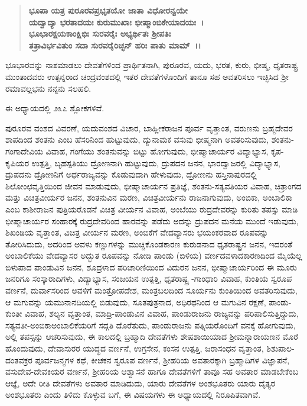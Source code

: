 \begin{verse}
\textbf{ಭೂಪಾ ಯತ್ರ ಪುರೂರವಪ್ರಭೃತಯೋ ಜಾತಾ ವಿಧೋರನ್ವಯೇ}\\\textbf{ಯದ್ವಾದ್ಯಾ ಭರತಾದಯಃ ಕುರುಮುಖಾಃ ಭೀಷ್ಮಾಂಬಿಕೇಯಾದಯಃ~।} \\\textbf{ಭೂಭಾರಕ್ಷಯಕಾಂಕ್ಷಿಭಿಃ ಸುರವರೈಃ ಅಭ್ಯರ್ಥಿತಃ ಶ‍್ರೀಪತಿಃ}\\\textbf{ತತ್ರಾವಿರ್ಭವಿತುಂ ಸದಾ ಸುರವರೈರಿಚ್ಛನ್ ಹರಿಃ ಪಾತು ಮಾಮ್~।।}
\end{verse}

ಭೂಭಾರವನ್ನು ನಾಶಮಾಡಲು ದೇವತೆಗಳಿಂದ ಪ್ರಾರ್ಥಿತನಾಗಿ, ಪುರೂರವ, ಯದು, ಭರತ, ಕುರು, ಭೀಷ್ಮ, ಧೃತರಾಷ್ಟ್ರ ಮುಂತಾದವರು ಉತ್ಪನ್ನರಾದ ಚಂದ್ರವಂಶದಲ್ಲಿ ಇತರ ದೇವತೆಗಳೊಂದಿಗೆ ತಾನೂ ಸಹ ಅವತರಿಸಲು ಇಚ್ಛಿಸಿದ ಶ‍್ರೀ ರಮಾವಲ್ಲಭನು ನನ್ನನು ಸಲಹಲಿ.

ಈ ಅಧ್ಯಾಯದಲ್ಲಿ ೨೩೭ ಶ್ಲೋಕಗಳಿವೆ.

ಪುರೂರವ ವಂಶದ ವಿವರಣೆ, ಯದುವಂಶದ ವಿಚಾರ, ಬಾಹ್ಲೀಕರಾಜನ ಪೂರ್ವ ವೃತ್ತಾಂತ, ವರುಣನು ಬ್ರಹ್ಮದೇವರ ಶಾಪದಿಂದ ಶಂತನು ಎಂಬ ಹೆಸರಿನಿಂದ ಹುಟ್ಟುವುದು, ದ್ಯುನಾಮಕ ವಸುವು ಭೀಷ್ಮನಾಗಿ ಅವತರಿಸುವುದು, ಶಂತನು-ಗಂಗಾದೇವಿಯ ವಿವಾಹ, ಗಂಗೆಯು ಶಂತನುವನ್ನು ಬಿಟ್ಟು ಹೋಗುವುದು, ಭೀಷ್ಮಾಚಾರ್ಯರ ವಿದ್ಯಾಭ್ಯಾಸ, ಕೃಪ-\-ಕೃಪಿಯರ ಉತ್ಪತ್ತಿ, ಬೃಹಸ್ಪತಿಯು ದ್ರೋಣನಾಗಿ ಹುಟ್ಟುವುದು, ದ್ರುಪದನ ಜನನ, ಭಾರದ್ವಾಜರಲ್ಲಿ ವಿದ್ಯಾಭ್ಯಾಸ, ದ್ರುಪದನು ದ್ರೋಣನಿಗೆ ಅರ್ಧರಾಜ್ಯವನ್ನು ಕೊಡುವುದಾಗಿ ಹೇಳುವುದು, ದ್ರೋಣನು ಹಸ್ತಿನಾಪುರದಲ್ಲಿ ಶಿಲೋಂಛವೃತ್ತಿಯಿಂದ ಜೀವನ ಮಾಡುವುದು, ಭೀಷ್ಮಾಚಾರ್ಯನ ಪ್ರತಿಜ್ಞೆ, ಶಂತನು-ಸತ್ಯವತಿಯರ ವಿವಾಹ, ಚಿತ್ರಾಂಗದ ಮತ್ತು ವಿಚಿತ್ರವೀರ್ಯರ ಜನನ, ಶಂತನುವಿನ ಮರಣ, ವಿಚಿತ್ರವೀರ್ಯನು ರಾಜನಾಗುವುದು, ಅಂಬಿಕಾ, ಅಂಬಾಲಿಕಾ ಎಂಬ ಕಾಶೀರಾಜನ ಪುತ್ರಿಯರೊಡನೆ ವಿಚಿತ್ರ ವೀರ್ಯನ ವಿವಾಹ, ಅಂಬೆಯು ರುದ್ರದೇವರನ್ನು ಕುರಿತು ತಪಸ್ಸು ಮಾಡಿ ಭೀಷ್ಮಾಚಾರ್ಯರ ಸಂಹಾರಕ್ಕೆ ರುದ್ರದೇವರಿಂದ ಹಾರವನ್ನು ಪಡೆದು ಅದನ್ನು ದ್ರುಪದನ ಮನೆಯ ಮುಂದೆ ಇಡುವುದು, ಶಿಖಂಡಿಯ ವೃತ್ತಾಂತ, ವಿಚಿತ್ರ ವೀರ್ಯನ ಮರಣ, ಅಂಬಿಕೆಗೆ ವೇದವ್ಯಾಸರು ಭಯಂಕರವಾದ ರೂಪವನ್ನು ತೋರಿಸಿದುದು, ಅದರಿಂದ ಅವಳು ಕಣ್ಣುಗಳನ್ನು ಮುಚ್ಚಿಕೊಂಡಕಾರಣ ಕುರುಡನಾದ ಧೃತರಾಷ್ಟ್ರನ ಜನನ, ಇದರಂತೆ ಅಂಬಾಲಿಕೆಯು ವೇದವ್ಯಾಸರ ಅದ್ಭುತ ರೂಪವನ್ನು ನೋಡಿ ಪಾಂಡು (ಬಿಳಿಯ) ವರ್ಣದವಳಾದಕಾರಣದಿಂದ ಮೈಯೆಲ್ಲ ಬಿಳುಪಾದ ಪಾಂಡುವಿನ ಜನನ, ಶೂದ್ರಳಾದ ಪರಿಚಾರಿಣಿಯಿಂದ ವಿದುರನ ಜನನ, ಭೀಷ್ಮಾಚಾರ್ಯರಿಂದ ಈ ಮೂರು ಜನರಿಗೂ ಸಂಸ್ಕಾರಾದಿಗಳು, ವಿದ್ಯಾಭ್ಯಾಸ, ಸಂಜಯನ ಉತ್ಪತ್ತಿ, ಧೃತರಾಷ್ಟ್ರ -\-ಗಾಂಧಾರಿ ವಿವಾಹ, ಕುಂತಿಯ ಸ್ವರೂಪ ವರ್ಣನೆ, ದುರ್ವಾಸರಿಂದ ಅವಳಿಗೆ ಮಂತ್ರೋಪದೇಶ, ಮಂತ್ರಬಲದಿಂದ ಸೂರ್ಯನು ಕುಂತಿಯಿಂದ ಅವತರಿಸುವುದು, ಆ ಮಗುವನ್ನು ಯಮುನಾನದಿಯಲ್ಲಿ ಬಿಡುವುದು, ಸೂತಪುತ್ರನಾದ, ಅಧಿರಥನಿಂದ ಆ ಮಗುವಿನ ರಕ್ಷಣೆ, ಪಾಂಡು-ಕುಂತೀ ವಿವಾಹ, ಶಲ್ಯನ ವೃತ್ತಾಂತ, ಮಾದ್ರಿ-ಪಾಂಡುವಿನ ವಿವಾಹ, ಪಾಂಡುರಾಜನು ರಾಜ್ಯವನ್ನು ಪರಿಪಾಲಿಸುತ್ತಿದ್ದುದು, ಸತ್ಯವತೀ-ಅಂಬಿಕಾ\-ಅಂಬಾಲಿಕೆಯರಿಗೆ ಸದ್ಗತಿ ದೊರೆತುದು, ಪಾಂಡುರಾಜನು ಪತ್ನಿಯರೊಂದಿಗೆ ವನಕ್ಕೆ ಹೋಗುವುದು, ಅಲ್ಲಿ ತಪಸ್ಸನ್ನು ಆಚರಿಸುವುದು, ಈ ಕಾಲದಲ್ಲಿ ಬ್ರಹ್ಮಾದಿ ದೇವತೆಗಳು ಶೇಷಶಾಯಿಯಾದ ಶ‍್ರೀಮನ್ನಾರಾಯಣನ ಮೊರೆ ಹೊಂದುವುದು, ದೇವಾಸುರರ ಯುದ್ಧದ ವರ್ಣನೆ, ಉಗ್ರಸೇನ, ಕಂಸನ ಉತ್ಪತ್ತಿ, ಜರಾಸಂಧನ ವೃತ್ತಾಂತ, ಶಿಶುಪಾಲ-ದಂತವಕ್ರರ ಪೂರ್ವಜನ್ಮಗಳ ಕಥೆ, ಕೀಚಕನ ಸ್ವರೂಪ ವರ್ಣನೆ, ಶ‍್ರೀಹರಿಯ ಅವತಾರಕ್ಕಾಗಿ ಬ್ರಹ್ಮಾದಿಗಳ ವಿಜ್ಞಾಪನೆ, ವಸುದೇವ-ದೇವಕಿಯರ ವರ್ಣನೆ, ಶ‍್ರೀಹರಿಯ ಆಶ್ವಾಸನೆ ಹಾಗೂ ದೇವತೆಗಳಿಗೆ ತಾವೂ ಸಹ ಅವತಾರ ಮಾಡಬೇಕೆಂಬ ಆಜ್ಞೆ, ಅದೇ ರೀತಿ ದೇವತೆಗಳು ಅವತಾರ ಮಾಡಿದುದು, ಯಾರು ದೇವತೆಗಳ ಅಂಶಭೂತರು ಯಾರು ದೈತ್ಯರ ಅಂಶಭೂತರು ಎಂದು ತಿಳಿದು ಕೊಳ್ಳುವ ಬಗೆ, ಈ ವಿಷಯಗಳು ಈ ಅಧ್ಯಾಯದಲ್ಲಿ ನಿರೂಪಿತವಾಗಿವೆ.

